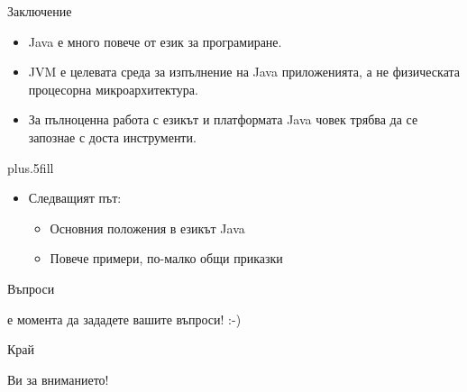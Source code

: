 \documentclass{beamer}
\begin{document}
\begin{frame}{Заключение}
  \transdissolve
  \begin{itemize}
  \item
    Java \alert{е много повече от език за програмиране}.
  \item
    JVM \alert{е целевата среда за изпълнение} на Java приложенията, а
    не физическата процесорна микроархитектура.
  \item
    За пълноценна работа с езикът и платформата Java човек трябва да
    се запознае с доста инструменти.
  \end{itemize}
  
  \vskip0pt plus.5fill
  \begin{itemize}
  \item
    Следващият път:
    \begin{itemize}
    \item
      Основния положения в езикът Java
    \item
      Повече примери, по-малко общи приказки
    \end{itemize}
  \end{itemize}
\end{frame}

\begin{frame}{Въпроси}
  \transdissolve
  \begin{center}
     е момента да зададете вашите въпроси! :-)
  \end{center}
\end{frame}

\begin{frame}{Край}
  \transdissolve
  \begin{center}
     Ви за вниманието!
  \end{center}
\end{frame}
\end{document}

